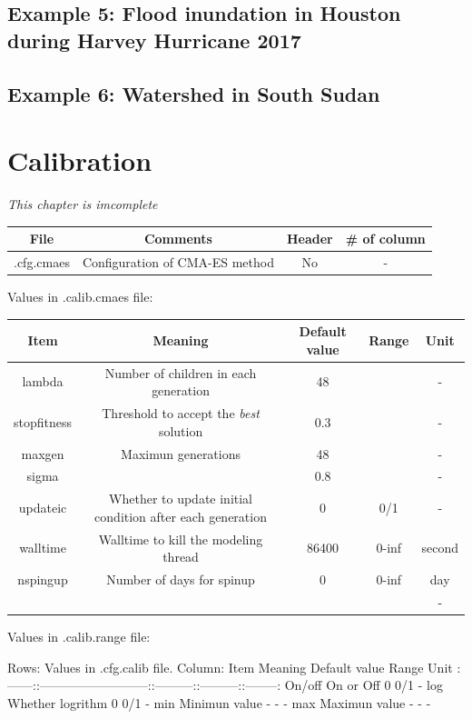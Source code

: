 \documentclass[
]{scrbook}
\begin{document}
\hypertarget{example-5-flood-inundation-in-houston-during-harvey-hurricane-2017}{%
\section{Example 5: Flood inundation in Houston during Harvey Hurricane 2017}\label{example-5-flood-inundation-in-houston-during-harvey-hurricane-2017}}

\hypertarget{example-6-watershed-in-south-sudan}{%
\section{Example 6: Watershed in South Sudan}\label{example-6-watershed-in-south-sudan}}

\hypertarget{calibration}{%
\chapter{Calibration}\label{calibration}}

\emph{This chapter is imcomplete}

\begin{longtable}[]{@{}cccc@{}}
\toprule
File & Comments & Header & \# of column\tabularnewline
\midrule
\endhead
.cfg.cmaes & Configuration of CMA-ES method & No & -\tabularnewline
\bottomrule
\end{longtable}

Values in .calib.cmaes file:

\begin{longtable}[]{@{}ccccc@{}}
\toprule
Item & Meaning & Default value & Range & Unit\tabularnewline
\midrule
\endhead
lambda & Number of children in each generation & 48 & & -\tabularnewline
stopfitness & Threshold to accept the \emph{best} solution & 0.3 & & -\tabularnewline
maxgen & Maximun generations & 48 & & -\tabularnewline
sigma & & 0.8 & & -\tabularnewline
updateic & Whether to update initial condition after each generation & 0 & 0/1 & -\tabularnewline
walltime & Walltime to kill the modeling thread & 86400 & 0-inf & second\tabularnewline
nspingup & Number of days for spinup & 0 & 0-inf & day\tabularnewline
& & & & -\tabularnewline
\bottomrule
\end{longtable}

Values in .calib.range file:

Rows: Values in .cfg.calib file.
Column:
\textbar{} Item \textbar{} Meaning \textbar{} Default value \textbar{} Range \textbar{} Unit \textbar{}
\textbar:------:\textbar:--------------------------:\textbar:---------:\textbar:---------:\textbar:--------:\textbar{}
\textbar{} On/off \textbar{} On or Off \textbar{} 0 \textbar{} 0/1 \textbar{} - \textbar{}
\textbar{} log \textbar{} Whether logrithm \textbar{} 0 \textbar{} 0/1 \textbar{} - \textbar{}
\textbar{} min \textbar{} Minimun value \textbar{} - \textbar{} - \textbar{} - \textbar{}
\textbar{} max \textbar{} Maximun value \textbar{} - \textbar{} - \textbar{} - \textbar{}
\end{document}
